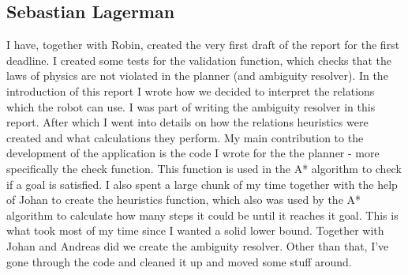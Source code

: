 \subsection*{Sebastian Lagerman}
I have, together with Robin, created the very first draft of the report for the first deadline.
\newline
\newline
I created some tests for the validation function, which checks that the laws of physics are not violated in the planner (and ambiguity resolver).
\newline
\newline
In the introduction of this report I wrote how we decided to interpret the relations which the robot can use.
I was part of writing the ambiguity resolver in this report.
After which I went into details on how the relations heuristics were created and what calculations they perform.
\newline
\newline
My main contribution to the development of the application is the code I wrote for the the planner - more specifically the check function.
This function is used in the A* algorithm to check if a goal is satisfied.
I also spent a large chunk of my time together with the help of Johan to create the heuristics function, which also was used by the A* algorithm to calculate how many steps it could be until it reaches it goal.
This is what took most of my time since I wanted a solid lower bound.
Together with Johan and Andreas did we create the ambiguity resolver.
Other than that, I've gone through the code and cleaned it up and moved some stuff around.

